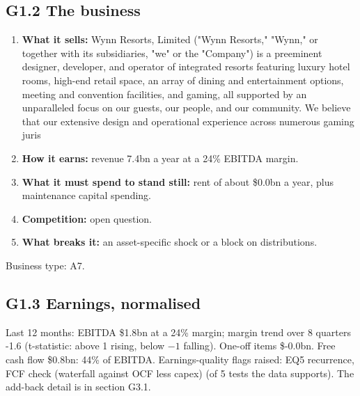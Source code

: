 \documentclass[11pt,a4paper]{article}
\begin{document}
\subsection*{G1.2 The business}
\begin{enumerate}
\item \textbf{What it sells:} Wynn Resorts, Limited ("Wynn Resorts," "Wynn," or together with its subsidiaries, "we" or the "Company") is a preeminent designer, developer, and operator of integrated resorts featuring luxury hotel rooms, high-end retail space, an array of dining and entertainment options, meeting and convention facilities, and gaming, all supported by an unparalleled focus on our guests, our people, and our community. We believe that our extensive design and operational experience across numerous gaming juris
\item \textbf{How it earns:} revenue 7.4bn a year at a 24\% EBITDA margin.
\item \textbf{What it must spend to stand still:} rent of about \$0.0bn a year, plus maintenance capital spending.
\item \textbf{Competition:} open question.
\item \textbf{What breaks it:} an asset-specific shock or a block on distributions.
\end{enumerate}
Business type: A7.
\subsection*{G1.3 Earnings, normalised}
Last 12 months: EBITDA \$1.8bn at a 24\% margin; margin trend over 8 quarters -1.6 (t-statistic: above 1 rising, below $-1$ falling). One-off items \$-0.0bn. Free cash flow \$0.8bn: 44\% of EBITDA. Earnings-quality flags raised: EQ5 recurrence, FCF check (waterfall against OCF less capex) (of 5 tests the data supports). The add-back detail is in section G3.1.
\end{document}
